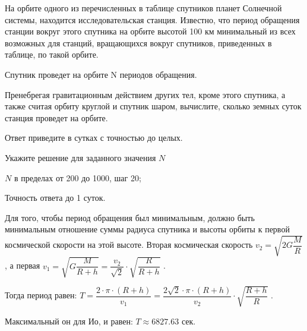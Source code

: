 На орбите одного из перечисленных в таблице спутников планет Солнечной системы, находится исследовательская станция. Известно, что период обращения станции вокруг этого спутника на орбите высотой 100 км минимальный из всех возможных для станций, вращающихся вокруг спутников, приведенных в таблице, по такой орбите.


Спутник проведет на орбите N периодов обращения. 

Пренебрегая гравитационным действием других тел, кроме этого
спутника, а также считая орбиту круглой и спутник шаром, вычислите, сколько
земных суток станция проведет на орбите. 

Ответ приведите в сутках с точностью до целых.

Укажите решение для заданного значения $N$

\paramSection

$N$ в пределах от 200 до 1000, шаг 20;         

Точность ответа  до  1  суток.

\soultionSection

Для того, чтобы период обращения был минимальным, должно быть минимальным отношение суммы радиуса спутника  
и высоты орбиты к первой космической скорости на этой высоте. Вторая космическая скорость $v_2=\sqrt{2G \dfrac{M}{R}}$, 
а первая  $v_1=\sqrt{G \dfrac{M}{R+h}}=\dfrac{v_2}{\sqrt{2}} \cdot \sqrt{\dfrac{R}{R+h}}$ .

Тогда период равен:  $T=\dfrac{2 \cdot \pi \cdot (R+h)}{  v_1 }=\dfrac{2\sqrt{2} \cdot \pi \cdot (R+h)}{v_2}  \cdot \sqrt{\dfrac{R+h}{R}}$ .

Максимальный он для Ио, и равен:  $ T \approx 6827.63$ сек.


